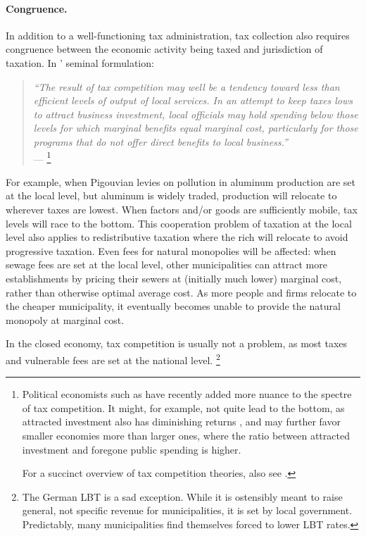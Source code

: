 \paragraph[Congruence]{Congruence.} In addition to a well-functioning tax administration, tax collection also requires congruence between the economic activity being taxed and jurisdiction of taxation.
In \citeauthor{Oates1972}' seminal formulation:
\begin{quote}
	\emph{``The result of tax competition may well be a tendency toward less than efficient levels of output of local services.
In an attempt to keep taxes lows to attract business investment, local officials may hold spending below those levels for which marginal benefits equal marginal cost, particularly for those programs that do not offer direct benefits to local business.''}\\
	--- \cite[143]{Oates1972}
	\footnote{
		Political economists such as \cite{Dehejia1999} have recently added more nuance to the spectre of tax competition.
		It might, for example, not quite lead to the bottom, as attracted investment also has diminishing returns \citeyearpar[416]{Dehejia1999}, and may further favor smaller economies more than larger ones, where the ratio between attracted investment and foregone public spending is higher.

		For a succinct overview of tax competition theories, also see \cite{Wilson1999}.
	}
\end{quote}
For example, when Pigouvian levies on pollution in aluminum production are set at the local level, but aluminum is widely traded, production will relocate to wherever taxes are lowest.
When factors and/or goods are sufficiently mobile, tax levels will race to the bottom.
This cooperation problem of taxation at the local level also applies to redistributive taxation where the rich will relocate to avoid progressive taxation.
Even fees for natural monopolies will be affected:
when sewage fees are set at the local level, other municipalities can attract more establishments by pricing their sewers at (initially much lower) marginal cost, rather than otherwise optimal average cost.
As more people and firms relocate to the cheaper municipality, it eventually becomes unable to provide the natural monopoly at marginal cost.

In the closed economy, tax competition is usually not a problem, as most taxes and vulnerable fees are set at the national level.
\footnote{
	The German \gls{LBT} is a sad exception.
	While it is ostensibly meant to raise general, not specific revenue for municipalities, it is set by local government.
	Predictably, many municipalities find themselves forced to lower \gls{LBT} rates.
}


